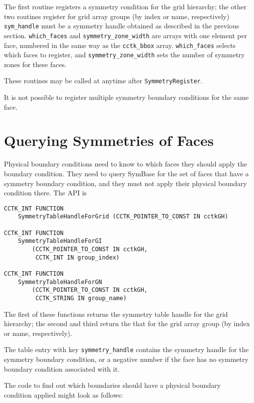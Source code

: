 The first routine registers a symmetry condition for the grid hierarchy;
the other two routines register for grid array groups (by index or 
name, respectively)
\texttt{sym\_handle} must be a symmetry handle obtained as
described in the previous section.  \texttt{which\_faces} and
\texttt{symmetry\_zone\_width} are arrays with one element per face,
numbered in the same way as the \texttt{cctk\_bbox} array.
\texttt{which\_faces} selects which faces to register, and
\texttt{symmetry\_zone\_width} sets the number of symmetry zones for
these faces.

These routines may be called at anytime after \texttt{SymmetryRegister}.

It is not possible to register multiple symmetry boundary conditions
for the same face.



\section{Querying Symmetries of Faces}

Physical boundary conditions need to know to which faces they should
apply the boundary condition.  They need to query SymBase for the set
of faces that have a symmetry boundary condition, and they must not
apply their physical boundary condition there.  The API is

\begin{verbatim}
CCTK_INT FUNCTION
    SymmetryTableHandleForGrid (CCTK_POINTER_TO_CONST IN cctkGH)

CCTK_INT FUNCTION
    SymmetryTableHandleForGI
        (CCTK_POINTER_TO_CONST IN cctkGH,
         CCTK_INT IN group_index)

CCTK_INT FUNCTION
    SymmetryTableHandleForGN
        (CCTK_POINTER_TO_CONST IN cctkGH,
         CCTK_STRING IN group_name)
\end{verbatim}

The first of these functions returns the symmetry table handle for the
grid hierarchy; the second and third return the that for the grid array group
(by index or name, respectively).

The table entry with key \texttt{symmetry\_handle} contains the symmetry
handle for the symmetry boundary condition, or a negative number if the face
has no symmetry boundary condition associated with it.

The code to find out which boundaries should have a physical boundary
condition applied might look as follows:

